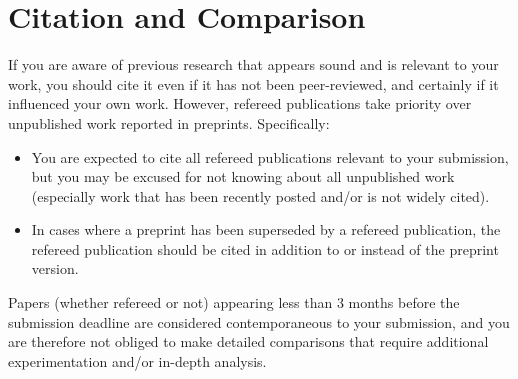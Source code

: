 \pagebreak

\section*{Citation and Comparison}\vspace{2em}

If you are aware of previous research that appears sound and is relevant to your work, you should cite it even if it has not been peer-reviewed, and certainly if it influenced your own work. However, refereed publications take priority over unpublished work reported in preprints. Specifically:
    
\begin{itemize}
    \item You are expected to cite all refereed publications relevant to your submission, but you may be excused for not knowing about all unpublished work (especially work that has been recently posted and/or is not widely cited).
    \item In cases where a preprint has been superseded by a refereed publication, the refereed publication should be cited in addition to or instead of the preprint version.
\end{itemize}

Papers (whether refereed or not) appearing less than 3 months before the submission deadline are considered contemporaneous to your submission, and you are therefore not obliged to make detailed comparisons that require additional experimentation and/or in-depth analysis.

